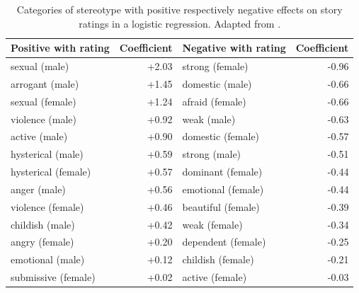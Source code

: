 \begin{table}[ht]
    \centering
    \begin{tabular}{lrlr}
        \toprule
        \textbf{Positive with rating} & \textbf{Coefficient} & \textbf{Negative with rating} & \textbf{Coefficient} \\
        \midrule
        sexual (male)                 & +2.03                & strong (female)               & -0.96                \\
        arrogant (male)               & +1.45                & domestic (male)               & -0.66                \\
        sexual (female)               & +1.24                & afraid (female)               & -0.66                \\
        violence (male)               & +0.92                & weak (male)                   & -0.63                \\
        active (male)                 & +0.90                & domestic (female)             & -0.57                \\
        hysterical (male)             & +0.59                & strong (male)                 & -0.51                \\
        hysterical (female)           & +0.57                & dominant (female)             & -0.44                \\
        anger (male)                  & +0.56                & emotional (female)            & -0.44                \\
        violence (female)             & +0.46                & beautiful (female)            & -0.39                \\
        childish (male)               & +0.42                & weak (female)                 & -0.34                \\
        angry (female)                & +0.20                & dependent (female)            & -0.25                \\
        emotional (male)              & +0.12                & childish (female)             & -0.21                \\
        submissive (female)           & +0.02                & active (female)               & -0.03                \\
        \bottomrule
    \end{tabular}
    \caption[Categories of stereotype with positive respectively negative effects on story ratings in a logistic regression.]{Categories of stereotype with positive respectively negative effects on story ratings in a logistic regression. Adapted from \citet[Table~4]{Fast2016ShirtlessCommunity}.}
    \label{tab:fast_2016_stereotype_categories_ratings}
\end{table}

